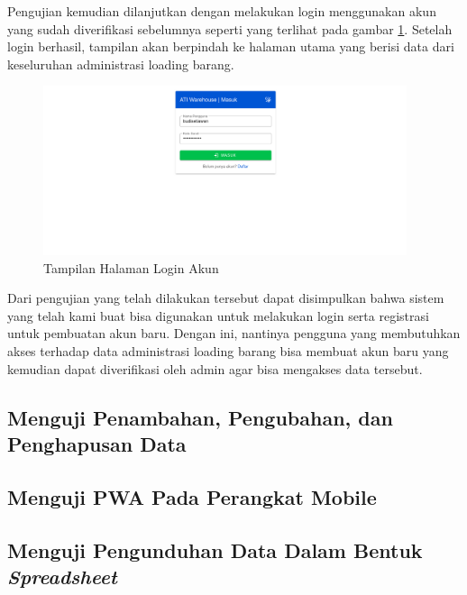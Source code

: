 Pengujian kemudian dilanjutkan dengan melakukan login menggunakan akun yang sudah diverifikasi sebelumnya seperti yang terlihat pada gambar \ref{fig:loginAkun}.
Setelah login berhasil, tampilan akan berpindah ke halaman utama yang berisi data dari keseluruhan administrasi loading barang.
\vspace{0.5ex}

\begin{figure} [ht!] \centering
  \includegraphics[width=0.95\textwidth]{gambar/login-akun.png}
  \caption{Tampilan Halaman Login Akun}
	\label{fig:loginAkun}
\end{figure}

Dari pengujian yang telah dilakukan tersebut dapat disimpulkan bahwa sistem yang telah kami buat bisa digunakan untuk melakukan login serta registrasi untuk pembuatan akun baru.
Dengan ini, nantinya pengguna yang membutuhkan akses terhadap data administrasi loading barang bisa membuat akun baru yang kemudian dapat diverifikasi oleh admin agar bisa mengakses data tersebut.
\vspace{0.5ex}

\subsection{Menguji Penambahan, Pengubahan, dan Penghapusan Data}
\vspace{1ex}

\lipsum[4]
\vspace{0.5ex}

\subsection{Menguji PWA Pada Perangkat Mobile}
\vspace{1ex}

\lipsum[4]
\vspace{0.5ex}

\subsection{Menguji Pengunduhan Data Dalam Bentuk \emph{Spreadsheet}}
\vspace{1ex}

\lipsum[4]
\vspace{0.5ex}